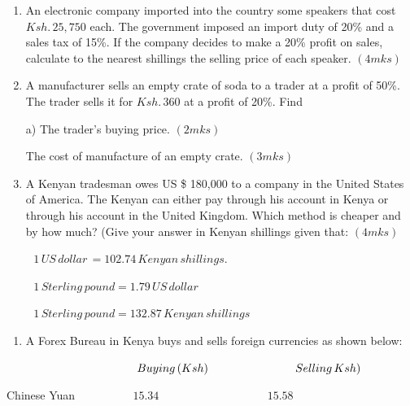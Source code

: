 \documentclass[
  a4paperpaper,
]{scrbook}
\providecommand{\tightlist}{%
  \setlength{\itemsep}{0pt}\setlength{\parskip}{0pt}}\usepackage{longtable,booktabs,array}
\begin{document}
\begin{tcolorbox}
\begin{enumerate}
\def\labelenumi{\arabic{enumi}.}
\setcounter{enumi}{10}
\item
  An electronic company imported into the country some speakers that
  cost \(Ksh.\, 25,750\) each. The government imposed an import duty of
  20\% and a sales tax of 15\%. If the company decides to make a 20\%
  profit on sales, calculate to the nearest shillings the selling price
  of each speaker. \hspace{14.2cm} \((4mks)\)
\item
  A manufacturer sells an empty crate of soda to a trader at a profit of
  50\%. The trader sells it for \(Ksh.\, 360\) at a profit of 20\%. Find

  a) The trader's buying price. \hspace{9cm} \((2mks)\)

  The cost of manufacture of an empty crate. \hspace{6cm} \((3mks)\)
\item
  A Kenyan tradesman owes US \$ 180,000 to a company in the United
  States of America. The Kenyan can either pay through his account in
  Kenya or through his account in the United Kingdom. Which method is
  cheaper and by how much? (Give your answer in Kenyan shillings given
  that: \hspace{12.3cm} \((4mks)\)
\end{enumerate}

\(\hspace{1cm} 1\, US \,dollar \,= 102.74\, Kenyan \,shillings.\)

\(\hspace{1cm} 1 \,Sterling \,pound = 1.79 \,US \,dollar\)

\(\hspace{1cm} 1\, Sterling \,pound = 132.87 \,Kenyan\, shillings\)

\begin{enumerate}
\def\labelenumi{\arabic{enumi}.}
\setcounter{enumi}{13}
\tightlist
\item
  A Forex Bureau in Kenya buys and sells foreign currencies as shown
  below:
\end{enumerate}

\(\hspace{4cm} Buying\, (Ksh) \hspace{2.7cm} Selling \, Ksh)\)

Chinese Yuan \(\hspace{2cm} 15.34 \hspace{4cm} 15.58\)


\end{tcolorbox}
\end{document}
